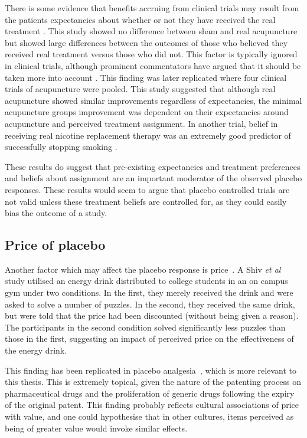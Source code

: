 There is some evidence that benefits accruing from clinical trials may result from the patients expectancies about whether or not they have received the real treatment \cite{Bausell2005}. This study showed no difference between sham and real acupuncture but showed large differences between the outcomes of those who believed they received real treatment versus those who did not. This factor is typically ignored in clinical trials, although prominent commentators have argued that it should be taken more into account \cite{Benedetti2007}. This finding was later replicated \cite{Linde2007}  where four clinical trials of acupuncture were pooled. This study suggested that although real acupuncture showed similar improvements regardless of expectancies, the minimal acupuncture groups improvement was dependent on their expectancies around acupuncture and perceived treatment assignment. In another trial, belief in receiving real nicotine replacement therapy was an extremely good predictor of successfully stopping smoking \cite{Benedetti2008}. 

These results do suggest that pre-existing expectancies and treatment preferences and beliefs about assignment are an important moderator of the observed placebo responses. These results would seem to argue that placebo controlled trials are not valid unless these treatment beliefs are controlled for, as they could easily bias the outcome of a study. 

\subsection{Price of placebo}
\label{sec:price}

Another factor which may affect the placebo response is price~\cite{Shiv2005a}. A Shiv \textit{et al} study utilised an energy drink distributed to college students in an on campus gym under two conditions. In the first, they merely received the drink and were asked to solve a number of puzzles. In the second, they received the same drink, but were told that the price had been discounted (without being given a reason). The participants in the second condition solved significantly less puzzles than those in the first, suggesting an impact of perceived price on the effectiveness of the energy drink. 

This finding has been replicated in placebo analgesia~\cite{Waber2008}, which is more relevant to this thesis. This is extremely topical, given the nature of the patenting process on pharmaceutical drugs and the proliferation of generic drugs following the expiry of the original patent. This finding probably reflects cultural associations of price with value, and one could hypothesise that in other cultures, items perceived as being of greater value would invoke similar effects.  

